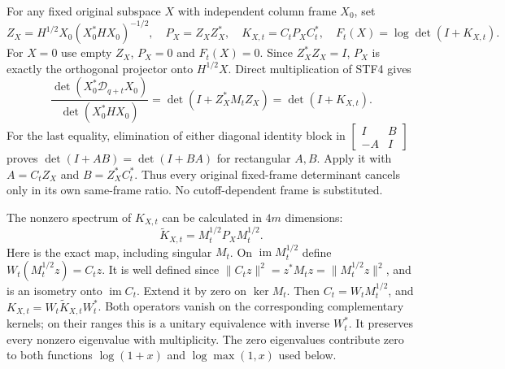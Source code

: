 \documentclass[11pt,a4paper]{article}
\begin{document}
For any fixed original subspace $X$ with independent column frame $X_0$,
set
\[
 Z_X=H^{1/2}X_0(X_0^*HX_0)^{-1/2},\quad
 P_X=Z_XZ_X^*,\quad K_{X,t}=C_tP_XC_t^*,\quad
 F_t(X)=\log\det(I+K_{X,t}).                              \tag{STF5}
\]
For $X=0$ use empty $Z_X$, $P_X=0$ and $F_t(X)=0$.
Since $Z_X^*Z_X=I$, $P_X$ is exactly the orthogonal projector onto
$H^{1/2}X$. Direct multiplication of STF4 gives
\[
 \frac{\det(X_0^*\mathcal D_{q+t}X_0)}{\det(X_0^*HX_0)}
 =\det(I+Z_X^*M_tZ_X)=\det(I+K_{X,t}).                    \tag{STF6}
\]
For the last equality, elimination of either diagonal identity block in
$\left[\begin{smallmatrix}I&B\\-A&I\end{smallmatrix}\right]$
proves $\det(I+AB)=\det(I+BA)$ for rectangular $A,B$.
Apply it with $A=C_tZ_X$ and $B=Z_X^*C_t^*$.
Thus every original fixed-frame determinant cancels only in its own
same-frame ratio. No cutoff-dependent frame is substituted.

The nonzero spectrum of $K_{X,t}$ can be calculated in $4m$ dimensions:
\[
             \widetilde K_{X,t}=M_t^{1/2}P_XM_t^{1/2}.     \tag{STF7}
\]
Here is the exact map, including singular $M_t$. On
$\operatorname{im}M_t^{1/2}$ define
$W_t(M_t^{1/2}z)=C_tz$. It is well defined since
$\|C_tz\|^2=z^*M_tz=\|M_t^{1/2}z\|^2$, and is an isometry onto
$\operatorname{im}C_t$. Extend it by zero on $\ker M_t$.
Then $C_t=W_tM_t^{1/2}$, and
$K_{X,t}=W_t\widetilde K_{X,t}W_t^*$.
Both operators vanish on the corresponding complementary kernels;
on their ranges this is a unitary equivalence with inverse $W_t^*$.
It preserves every nonzero eigenvalue with multiplicity. The zero
eigenvalues contribute zero to both functions $\log(1+x)$ and
$\log\max(1,x)$ used below.
\end{document}

